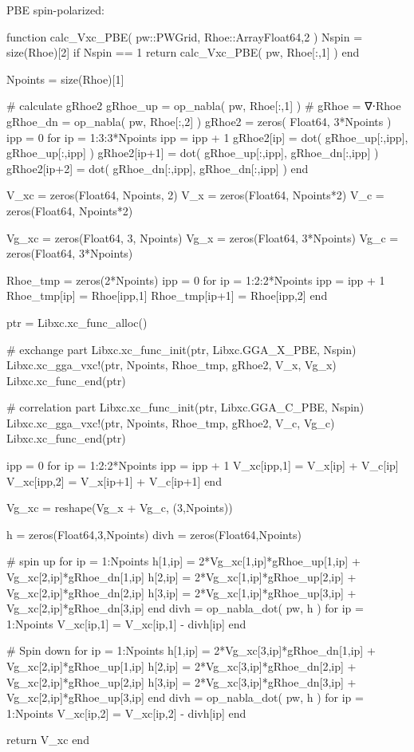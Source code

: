 PBE spin-polarized:
\begin{juliacode}
function calc_Vxc_PBE( pw::PWGrid, Rhoe::Array{Float64,2} )
    Nspin = size(Rhoe)[2]
    if Nspin == 1
        return calc_Vxc_PBE( pw, Rhoe[:,1] )
    end

    Npoints = size(Rhoe)[1]

    # calculate gRhoe2
    gRhoe_up = op_nabla( pw, Rhoe[:,1] ) # gRhoe = ∇⋅Rhoe
    gRhoe_dn = op_nabla( pw, Rhoe[:,2] )
    gRhoe2 = zeros( Float64, 3*Npoints )
    ipp = 0
    for ip = 1:3:3*Npoints
        ipp = ipp + 1
        gRhoe2[ip]   = dot( gRhoe_up[:,ipp], gRhoe_up[:,ipp] )
        gRhoe2[ip+1] = dot( gRhoe_up[:,ipp], gRhoe_dn[:,ipp] )
        gRhoe2[ip+2] = dot( gRhoe_dn[:,ipp], gRhoe_dn[:,ipp] )
    end

    V_xc = zeros(Float64, Npoints, 2)
    V_x  = zeros(Float64, Npoints*2)
    V_c  = zeros(Float64, Npoints*2)

    Vg_xc = zeros(Float64, 3, Npoints)
    Vg_x  = zeros(Float64, 3*Npoints)
    Vg_c  = zeros(Float64, 3*Npoints)

    Rhoe_tmp = zeros(2*Npoints)
    ipp = 0
    for ip = 1:2:2*Npoints
        ipp = ipp + 1
        Rhoe_tmp[ip] = Rhoe[ipp,1]
        Rhoe_tmp[ip+1] = Rhoe[ipp,2]
    end

    ptr = Libxc.xc_func_alloc()

    # exchange part
    Libxc.xc_func_init(ptr, Libxc.GGA_X_PBE, Nspin)
    Libxc.xc_gga_vxc!(ptr, Npoints, Rhoe_tmp, gRhoe2, V_x, Vg_x)
    Libxc.xc_func_end(ptr)

    # correlation part
    Libxc.xc_func_init(ptr, Libxc.GGA_C_PBE, Nspin)
    Libxc.xc_gga_vxc!(ptr, Npoints, Rhoe_tmp, gRhoe2, V_c, Vg_c)
    Libxc.xc_func_end(ptr)

    ipp = 0
    for ip = 1:2:2*Npoints
        ipp = ipp + 1
        V_xc[ipp,1] = V_x[ip] + V_c[ip]
        V_xc[ipp,2] = V_x[ip+1] + V_c[ip+1]
    end

    Vg_xc = reshape(Vg_x + Vg_c, (3,Npoints))

    h = zeros(Float64,3,Npoints)
    divh = zeros(Float64,Npoints)

    # spin up
    for ip = 1:Npoints
        h[1,ip] = 2*Vg_xc[1,ip]*gRhoe_up[1,ip] + Vg_xc[2,ip]*gRhoe_dn[1,ip]
        h[2,ip] = 2*Vg_xc[1,ip]*gRhoe_up[2,ip] + Vg_xc[2,ip]*gRhoe_dn[2,ip]
        h[3,ip] = 2*Vg_xc[1,ip]*gRhoe_up[3,ip] + Vg_xc[2,ip]*gRhoe_dn[3,ip]
    end
    divh = op_nabla_dot( pw, h )
    for ip = 1:Npoints
        V_xc[ip,1] = V_xc[ip,1] - divh[ip]
    end

    # Spin down
    for ip = 1:Npoints
        h[1,ip] = 2*Vg_xc[3,ip]*gRhoe_dn[1,ip] + Vg_xc[2,ip]*gRhoe_up[1,ip]
        h[2,ip] = 2*Vg_xc[3,ip]*gRhoe_dn[2,ip] + Vg_xc[2,ip]*gRhoe_up[2,ip]
        h[3,ip] = 2*Vg_xc[3,ip]*gRhoe_dn[3,ip] + Vg_xc[2,ip]*gRhoe_up[3,ip]
    end
    divh = op_nabla_dot( pw, h )
    for ip = 1:Npoints
        V_xc[ip,2] = V_xc[ip,2] - divh[ip]
    end

    return V_xc
end
\end{juliacode}
